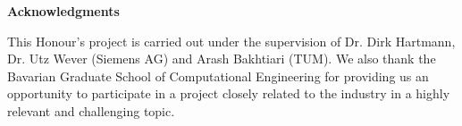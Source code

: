 \clearemptydoublepage
{}
{}	



\vspace*{2cm}

\begin{center}
{\Large \bf Acknowledgments}
\end{center}

\vspace{1cm}

This Honour's project is carried out under the supervision of Dr. Dirk Hartmann, Dr. Utz Wever (Siemens AG) and Arash Bakhtiari (TUM). We also thank the Bavarian Graduate School of Computational Engineering for providing us an opportunity to participate in a project closely related to the industry in a highly relevant and challenging topic.